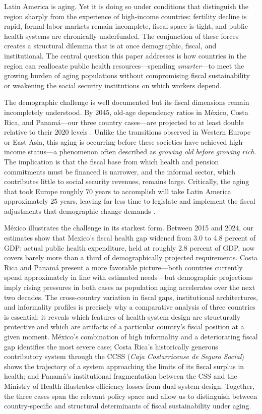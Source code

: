 \documentclass[12pt,a4paper]{article}
\begin{document}
Latin America is aging. Yet it is doing so under conditions that distinguish the region sharply from the experience of high-income countries: fertility decline is rapid, formal labor markets remain incomplete, fiscal space is tight, and public health systems are chronically underfunded. The conjunction of these forces creates a structural dilemma that is at once demographic, fiscal, and institutional. The central question this paper addresses is how countries in the region can reallocate public health resources---spending \textit{smarter}---to meet the growing burden of aging populations without compromising fiscal sustainability or weakening the social security institutions on which workers depend.

The demographic challenge is well documented but its fiscal dimensions remain incompletely understood. By 2045, old-age dependency ratios in M\'exico, Costa Rica, and Panam\'a---our three country cases---are projected to at least double relative to their 2020 levels \citep{ECLAC2022}. Unlike the transitions observed in Western Europe or East Asia, this aging is occurring before these societies have achieved high-income status---a phenomenon often described as \textit{growing old before growing rich}. The implication is that the fiscal base from which health and pension commitments must be financed is narrower, and the informal sector, which contributes little to social security revenues, remains large. Critically, the aging that took Europe roughly 70 years to accomplish will take Latin America approximately 25 years, leaving far less time to legislate and implement the fiscal adjustments that demographic change demands \citep{WorldBankInformalizing2025}.

M\'exico illustrates the challenge in its starkest form. Between 2015 and 2024, our estimates show that Mexico's fiscal health gap widened from 3.0 to 4.8 percent of GDP: actual public health expenditure, held at roughly 2.8 percent of GDP, now covers barely more than a third of demographically projected requirements. Costa Rica and Panam\'a present a more favorable picture---both countries currently spend approximately in line with estimated needs---but demographic projections imply rising pressures in both cases as population aging accelerates over the next two decades. The cross-country variation in fiscal gaps, institutional architectures, and informality profiles is precisely why a comparative analysis of three countries is essential: it reveals which features of health-system design are structurally protective and which are artifacts of a particular country's fiscal position at a given moment. M\'exico's combination of high informality and a deteriorating fiscal gap identifies the most severe case; Costa Rica's historically generous contributory system through the CCSS (\textit{Caja Costarricense de Seguro Social}) shows the trajectory of a system approaching the limits of its fiscal surplus in health; and Panam\'a's institutional fragmentation between the CSS and the Ministry of Health illustrates efficiency losses from dual-system design. Together, the three cases span the relevant policy space and allow us to distinguish between country-specific and structural determinants of fiscal sustainability under aging.
\end{document}
